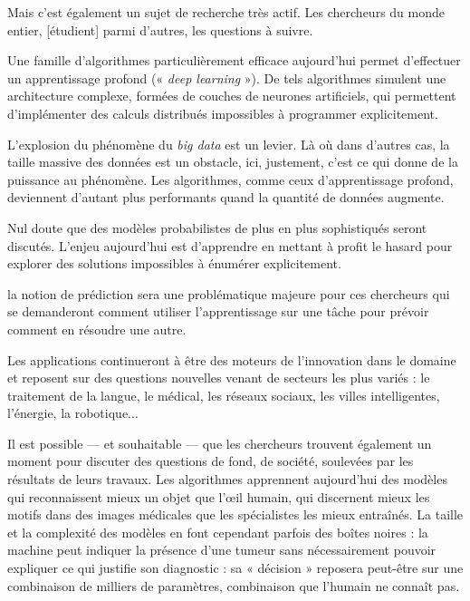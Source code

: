 Mais c’est également un sujet de recherche très actif. Les chercheurs du monde entier, [étudient] parmi d’autres, les questions à suivre.
\begin{jazzitemize}
\item Une famille d’algorithmes particulièrement efficace aujourd’hui permet d’effectuer un apprentissage profond (« \textit{deep learning} »). De tels algorithmes simulent une architecture complexe, formées de couches de neurones artificiels, qui permettent d’implémenter des calculs distribués impossibles à programmer explicitement.
\item L’explosion du phénomène du \textit{big data} est un levier. Là où dans d’au\-tres cas, la taille massive des données est un obstacle, ici, justement, c’est ce qui donne de la puissance au phénomène. Les algorithmes, comme ceux d’apprentissage profond, deviennent d’autant plus performants quand la quantité de données augmente.
\item Nul doute que des modèles probabilistes de plus en plus sophistiqués seront discutés. L’enjeu aujourd’hui est d’apprendre en mettant à profit le hasard pour explorer des solutions impossibles à énumérer explicitement.
\item la notion de prédiction sera une problématique majeure pour ces chercheurs qui se demanderont comment utiliser l’apprentissage sur une tâche pour prévoir comment en résoudre une autre.
\item Les applications continueront à être des moteurs de l’innovation dans le domaine et reposent sur des questions nouvelles venant de secteurs les plus variés : le traitement de la langue, le médical, les réseaux sociaux, les villes intelligentes, l’énergie, la robotique...
\end{jazzitemize}


Il est possible --- et souhaitable --- que les chercheurs trouvent également un moment pour discuter des questions de fond, de société, soulevées par les résultats de leurs travaux. Les algorithmes appren\-nent aujourd’hui des modèles qui reconnaissent mieux un objet que l’œil humain, qui discernent mieux les motifs dans des images médicales que les spécialistes les mieux entraînés. La taille et la complexité des modèles en font cependant parfois des boîtes noires : la machine peut indiquer la présence d’une tumeur sans nécessairement pouvoir expliquer ce qui justifie son diagnostic : sa « décision » reposera peut-être sur une combinaison de milliers de paramètres, combinaison que l’humain ne connaît pas.

